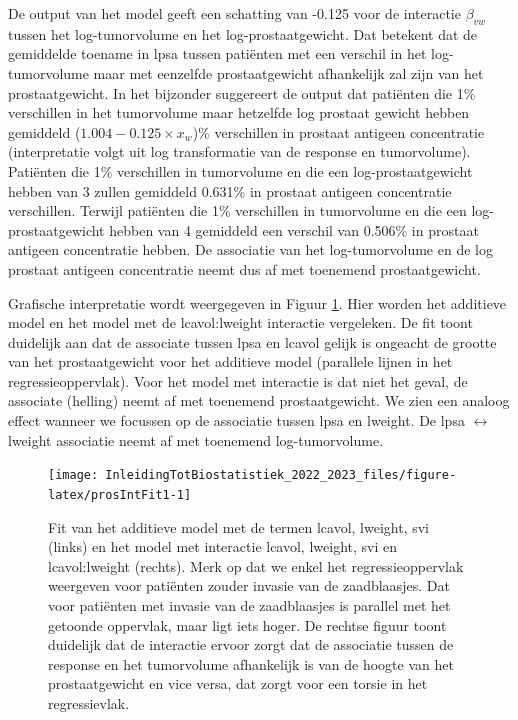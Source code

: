 \documentclass[
  12pt,dutch,coursenotes]{book}
\begin{document}
De output van het model geeft een schatting van -0.125 voor de interactie \(\beta_{vw}\) tussen het log-tumorvolume en het log-prostaatgewicht. Dat betekent dat de gemiddelde toename in lpsa tussen patiënten met een verschil in het log-tumorvolume maar met eenzelfde prostaatgewicht afhankelijk zal zijn van het prostaatgewicht.
In het bijzonder suggereert de output dat patiënten die 1\% verschillen in het tumorvolume maar hetzelfde log prostaat gewicht hebben gemiddeld (\(1.004-0.125 \times x_w\))\% verschillen in prostaat antigeen concentratie (interpretatie volgt uit log transformatie van de response en tumorvolume).
Patiënten die 1\% verschillen in tumorvolume en die een log-prostaatgewicht hebben van 3 zullen gemiddeld 0.631\% in prostaat antigeen concentratie verschillen. Terwijl patiënten die 1\% verschillen in tumorvolume en die een log-prostaatgewicht hebben van 4 gemiddeld een verschil van 0.506\% in prostaat antigeen concentratie hebben. De associatie van het log-tumorvolume en de log prostaat antigeen concentratie neemt dus af met toenemend prostaatgewicht.

Grafische interpretatie wordt weergegeven in Figuur \ref{fig:prosIntFit1}. Hier worden het additieve model en het model met de lcavol:lweight interactie vergeleken. De fit toont duidelijk aan dat de associate tussen lpsa en lcavol gelijk is ongeacht de grootte van het prostaatgewicht voor het additieve model (parallele lijnen in het regressieoppervlak). Voor het model met interactie is dat niet het geval, de associate (helling) neemt af met toenemend prostaatgewicht. We zien een analoog effect wanneer we focussen op de associatie tussen lpsa en lweight. De lpsa \(\leftrightarrow\) lweight associatie neemt af met toenemend log-tumorvolume.

\begin{figure}

{\centering \texttt{[image: InleidingTotBiostatistiek\_2022\_2023\_files/figure-latex/prosIntFit1-1]} 

}

\caption{Fit van het additieve model met de termen lcavol, lweight, svi (links) en het model met interactie lcavol, lweight, svi en lcavol:lweight (rechts). Merk op dat we enkel het regressieoppervlak weergeven voor patiënten zouder invasie van de zaadblaasjes. Dat voor patiënten met invasie van de zaadblaasjes is parallel met het getoonde oppervlak, maar ligt iets hoger. De rechtse figuur toont duidelijk dat de interactie ervoor zorgt dat de associatie tussen de response en het tumorvolume afhankelijk is van de hoogte van het prostaatgewicht en vice versa, dat zorgt voor een torsie in het regressievlak.}\label{fig:prosIntFit1}
\end{figure}
\end{document}
